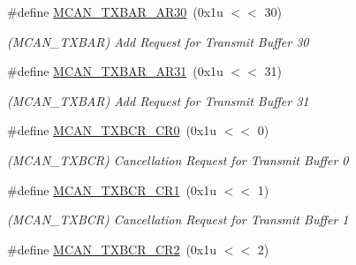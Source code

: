 \begin{DoxyCompactItemize}
\mbox{\label{group__SAMV71__MCAN_ga30bcad7d24a51629e5a3c856a7ec704b}} 
\#define \mbox{\hyperlink{group__SAMV71__MCAN_ga30bcad7d24a51629e5a3c856a7ec704b}{M\+C\+A\+N\+\_\+\+T\+X\+B\+A\+R\+\_\+\+A\+R30}}~(0x1u $<$$<$ 30)
\begin{DoxyCompactList}\small\item\em (M\+C\+A\+N\+\_\+\+T\+X\+B\+AR) Add Request for Transmit Buffer 30 \end{DoxyCompactList}\item 
\mbox{\label{group__SAMV71__MCAN_ga59ef9b5b7e318f7414115292f4bf8cd1}} 
\#define \mbox{\hyperlink{group__SAMV71__MCAN_ga59ef9b5b7e318f7414115292f4bf8cd1}{M\+C\+A\+N\+\_\+\+T\+X\+B\+A\+R\+\_\+\+A\+R31}}~(0x1u $<$$<$ 31)
\begin{DoxyCompactList}\small\item\em (M\+C\+A\+N\+\_\+\+T\+X\+B\+AR) Add Request for Transmit Buffer 31 \end{DoxyCompactList}\item 
\mbox{\label{group__SAMV71__MCAN_gaf8313b057e1ffe8bbade783c75761b41}} 
\#define \mbox{\hyperlink{group__SAMV71__MCAN_gaf8313b057e1ffe8bbade783c75761b41}{M\+C\+A\+N\+\_\+\+T\+X\+B\+C\+R\+\_\+\+C\+R0}}~(0x1u $<$$<$ 0)
\begin{DoxyCompactList}\small\item\em (M\+C\+A\+N\+\_\+\+T\+X\+B\+CR) Cancellation Request for Transmit Buffer 0 \end{DoxyCompactList}\item 
\mbox{\label{group__SAMV71__MCAN_ga2889829596b3754ebaf2721027155a5c}} 
\#define \mbox{\hyperlink{group__SAMV71__MCAN_ga2889829596b3754ebaf2721027155a5c}{M\+C\+A\+N\+\_\+\+T\+X\+B\+C\+R\+\_\+\+C\+R1}}~(0x1u $<$$<$ 1)
\begin{DoxyCompactList}\small\item\em (M\+C\+A\+N\+\_\+\+T\+X\+B\+CR) Cancellation Request for Transmit Buffer 1 \end{DoxyCompactList}\item 
\mbox{\label{group__SAMV71__MCAN_gaac55cf064292e7e7d7af4f20d0ce547a}} 
\#define \mbox{\hyperlink{group__SAMV71__MCAN_gaac55cf064292e7e7d7af4f20d0ce547a}{M\+C\+A\+N\+\_\+\+T\+X\+B\+C\+R\+\_\+\+C\+R2}}~(0x1u $<$$<$ 2)
$$
\end{DoxyCompactItemize}
